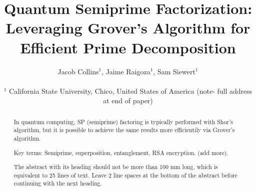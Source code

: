 \documentclass[twocolumn]{cinc}
\begin{document}


\title{Quantum Semiprime Factorization: Leveraging Grover's Algorithm for Efficient Prime Decomposition}


\author {Jacob Collins$^{1}$, Jaime Raigoza$^{1}$, Sam Siewert$^{1}$ \\
\ \\ %
 $^1$ California State University, Chico, United States of America (note- full address at end of paper)}

\maketitle

\begin{abstract}

  In quantum computing, SP (semiprime) factoring is typically performed 
  with Shor's algorithm, but it is possible to achieve the same results
  more efficientily via Grover's algorithm\cite{quantum_factoring, grover}. 

  Key terms: Semiprime, superposition, entanglement, RSA encryption, (add more).

  The abstract with its heading should not be more than 100 mm long,
  which is equivalent to 25 lines of text. Leave 2 line spaces at the
  bottom of the abstract before continuing with the next heading.


\end{abstract}
\end{document}
